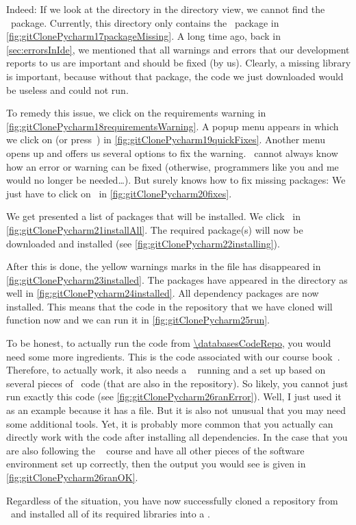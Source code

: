 Indeed: If we look at the  directory in the directory view, we cannot find the \psycopg\ package.
Currently, this directory only contains the \pip\ package in \cref{fig:gitClonePycharm17packageMissing}.
A long time ago, back in \cref{sec:errorsInIde}, we mentioned that all warnings and errors that our development  reports to us are important and should be fixed (by us).
Clearly, a missing library is important, because without that package, the code we just downloaded would be useless and could not run.

To remedy this issue, we click on the requirements warning in \cref{fig:gitClonePycharm18requirementsWarning}.
A popup menu appears in which we click on  (or press~\keys{\Alt+\enter}) in \cref{fig:gitClonePycharm19quickFixes}.
Another menu opens up and offers us several options to fix the warning.
\pycharm\ cannot always know how an error or warning can be fixed (otherwise, programmers like you and me would no longer be needed\dots).
But surely knows how to fix missing packages:
We just have to click on~ in \cref{fig:gitClonePycharm20fixes}.

We get presented a list of packages that will be installed.
We click~ in \cref{fig:gitClonePycharm21installAll}.
The required package(s) will now be downloaded and installed (see \cref{fig:gitClonePycharm22installing}).

After this is done, the yellow warnings marks in the  file has disappeared in \cref{fig:gitClonePycharm23installed}.
The packages have appeared in the  directory as well in \cref{fig:gitClonePycharm24installed}.
All dependency packages are now installed.
This means that the code in the repository that we have cloned will function now and we can run it in \cref{fig:gitClonePycharm25run}.

To be honest, to actually run the code from \url{\databasesCodeRepo}, you would need some more ingredients.
This is the code associated with our  course book~\cite{databases}.
Therefore, to actually work, it also needs a \postgresql\  running and a  set up based on several pieces of \sql\ code (that are also in the repository).
So likely, you cannot just run exactly this code (see \cref{fig:gitClonePycharm26ranError}).
Well, I just used it as an example because it has a  file.
But it is also not unusual that you may need some additional tools.
Yet, it is probably more common that you actually can directly work with the code after installing all dependencies.
In the case that you are also following the ~\cite{databases} course and have all other pieces of the software environment set up correctly, then the output you would see is given in \cref{fig:gitClonePycharm26ranOK}.

Regardless of the situation, you have now successfully cloned a repository from \github\ and installed all of its required libraries into a .%
%
\FloatBarrier%
\endhsection%
